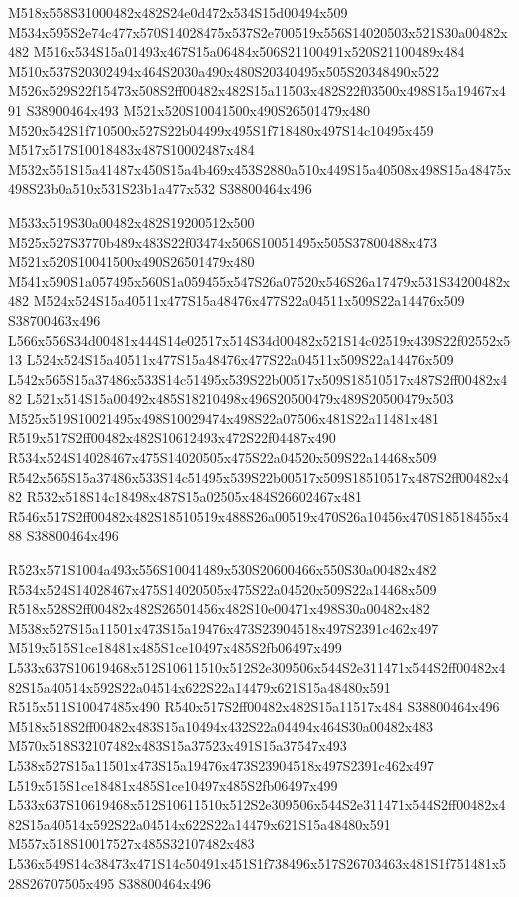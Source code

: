 \documentclass{article}
\begin{document}
\begin{multicols}{2}
M518x558S31000482x482S24e0d472x534S15d00494x509 M534x595S2e74c477x570S14028475x537S2e700519x556S14020503x521S30a00482x482 M516x534S15a01493x467S15a06484x506S21100491x520S21100489x484 M510x537S20302494x464S2030a490x480S20340495x505S20348490x522 M526x529S22f15473x508S2ff00482x482S15a11503x482S22f03500x498S15a19467x491 S38900464x493 M521x520S10041500x490S26501479x480 M520x542S1f710500x527S22b04499x495S1f718480x497S14c10495x459 M517x517S10018483x487S10002487x484 M532x551S15a41487x450S15a4b469x453S2880a510x449S15a40508x498S15a48475x498S23b0a510x531S23b1a477x532 S38800464x496

M533x519S30a00482x482S19200512x500 M525x527S3770b489x483S22f03474x506S10051495x505S37800488x473 M521x520S10041500x490S26501479x480 M541x590S1a057495x560S1a059455x547S26a07520x546S26a17479x531S34200482x482 M524x524S15a40511x477S15a48476x477S22a04511x509S22a14476x509 S38700463x496 L566x556S34d00481x444S14e02517x514S34d00482x521S14c02519x439S22f02552x513 L524x524S15a40511x477S15a48476x477S22a04511x509S22a14476x509 L542x565S15a37486x533S14c51495x539S22b00517x509S18510517x487S2ff00482x482 L521x514S15a00492x485S18210498x496S20500479x489S20500479x503 M525x519S10021495x498S10029474x498S22a07506x481S22a11481x481 R519x517S2ff00482x482S10612493x472S22f04487x490 R534x524S14028467x475S14020505x475S22a04520x509S22a14468x509 R542x565S15a37486x533S14c51495x539S22b00517x509S18510517x487S2ff00482x482 R532x518S14c18498x487S15a02505x484S26602467x481 R546x517S2ff00482x482S18510519x488S26a00519x470S26a10456x470S18518455x488 S38800464x496

R523x571S1004a493x556S10041489x530S20600466x550S30a00482x482 R534x524S14028467x475S14020505x475S22a04520x509S22a14468x509 R518x528S2ff00482x482S26501456x482S10e00471x498S30a00482x482 M538x527S15a11501x473S15a19476x473S23904518x497S2391c462x497 M519x515S1ce18481x485S1ce10497x485S2fb06497x499 L533x637S10619468x512S10611510x512S2e309506x544S2e311471x544S2ff00482x482S15a40514x592S22a04514x622S22a14479x621S15a48480x591 R515x511S10047485x490 R540x517S2ff00482x482S15a11517x484 S38800464x496 M518x518S2ff00482x483S15a10494x432S22a04494x464S30a00482x483 M570x518S32107482x483S15a37523x491S15a37547x493 L538x527S15a11501x473S15a19476x473S23904518x497S2391c462x497 L519x515S1ce18481x485S1ce10497x485S2fb06497x499 L533x637S10619468x512S10611510x512S2e309506x544S2e311471x544S2ff00482x482S15a40514x592S22a04514x622S22a14479x621S15a48480x591 M557x518S10017527x485S32107482x483 L536x549S14c38473x471S14c50491x451S1f738496x517S26703463x481S1f751481x528S26707505x495 S38800464x496


\end{multicols}
\end{document}
